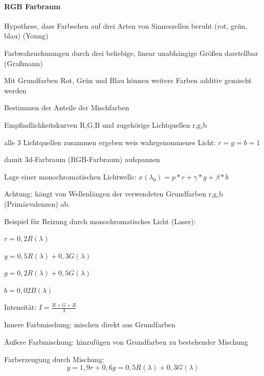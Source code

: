 \documentclass[landscape]{article}
\begin{document}
\begin{multicols}{3}
  \paragraph{RGB Farbraum}
  \begin{itemize*}
    \item Hypothese, dass Farbsehen auf drei Arten von Sinneszellen beruht (rot, grün, blau) (Young)
    \item Farbwahrnehmungen durch drei beliebige, linear unabhängige Größen darstellbar (Graßmann)
    \item Mit Grundfarben Rot, Grün und Blau können weitere Farben additiv gemischt werden
    \item Bestimmen der Anteile der Mischfarben
    \begin{itemize*}
      \item Empfindlichkeitskurven R,G,B und zugehörige Lichtquellen r,g,b
      \item alle 3 Lichtquellen zusammen ergeben weis wahrgenommenes Licht: $r=g=b=1$
      \item damit 3d-Farbraum (RGB-Farbraum) aufspannen
      \item Lage einer monochromatischen Lichtwelle: $x(\lambda_0)=p*r+\gamma*g+\beta*b$
      \item Achtung: hängt von Wellenlängen der verwendeten Grundfarben r,g,b (Primärvalenzen) ab.
    \end{itemize*}
    \item Beispiel für Reizung durch monochromatisches Licht (Laser):
    \begin{itemize*}
      \item $r=0,2R(\lambda)$
      \item $y=0,5R(\lambda)+0,3G(\lambda)$
      \item $g=0,2R(\lambda)+0,5G(\lambda)$
      \item $b=0,02B(\lambda)$
    \end{itemize*}
    \item Intensität: $I=\frac{R+G+B}{3}$
    \item Innere Farbmischung: mischen direkt aus Grundfarben
    \item Äußere Farbmischung: hinzufügen von Grundfarben zu bestehender Mischung
  \end{itemize*}
  
  Farberzeugung durch Mischung: $$y=1,9r + 0,6g =0,5R(\lambda)+0,3G(\lambda)$$
  

\end{multicols}
\end{document}
